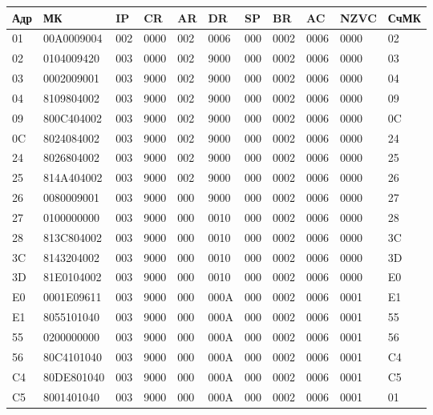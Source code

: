 \begin{tabular}{|*{11}{l|}}
\hline
Адр	&	МК	&	IP	&	CR	&	AR	&	DR	&	SP	&	BR	&	AC	&	NZVC	&	СчМК	\\\hline
01	&	00A0009004	&	002	&	0000	&	002	&	0006	&	000	&	0002	&	0006	&	0000	&	02	\\
02	&	0104009420	&	003	&	0000	&	002	&	9000	&	000	&	0002	&	0006	&	0000	&	03	\\
03	&	0002009001	&	003	&	9000	&	002	&	9000	&	000	&	0002	&	0006	&	0000	&	04	\\
04	&	8109804002	&	003	&	9000	&	002	&	9000	&	000	&	0002	&	0006	&	0000	&	09	\\
09	&	800C404002	&	003	&	9000	&	002	&	9000	&	000	&	0002	&	0006	&	0000	&	0C	\\
0C	&	8024084002	&	003	&	9000	&	002	&	9000	&	000	&	0002	&	0006	&	0000	&	24	\\
24	&	8026804002	&	003	&	9000	&	002	&	9000	&	000	&	0002	&	0006	&	0000	&	25	\\
25	&	814A404002	&	003	&	9000	&	002	&	9000	&	000	&	0002	&	0006	&	0000	&	26	\\
26	&	0080009001	&	003	&	9000	&	000	&	9000	&	000	&	0002	&	0006	&	0000	&	27	\\
27	&	0100000000	&	003	&	9000	&	000	&	0010	&	000	&	0002	&	0006	&	0000	&	28	\\
28	&	813C804002	&	003	&	9000	&	000	&	0010	&	000	&	0002	&	0006	&	0000	&	3C	\\
3C	&	8143204002	&	003	&	9000	&	000	&	0010	&	000	&	0002	&	0006	&	0000	&	3D	\\
3D	&	81E0104002	&	003	&	9000	&	000	&	0010	&	000	&	0002	&	0006	&	0000	&	E0	\\
E0	&	0001E09611	&	003	&	9000	&	000	&	000A	&	000	&	0002	&	0006	&	0001	&	E1	\\
E1	&	8055101040	&	003	&	9000	&	000	&	000A	&	000	&	0002	&	0006	&	0001	&	55	\\
55	&	0200000000	&	003	&	9000	&	000	&	000A	&	000	&	0002	&	0006	&	0001	&	56	\\
56	&	80C4101040	&	003	&	9000	&	000	&	000A	&	000	&	0002	&	0006	&	0001	&	C4	\\
C4	&	80DE801040	&	003	&	9000	&	000	&	000A	&	000	&	0002	&	0006	&	0001	&	C5	\\
C5	&	8001401040	&	003	&	9000	&	000	&	000A	&	000	&	0002	&	0006	&	0001	&	01	\\\hline
\end{tabular}